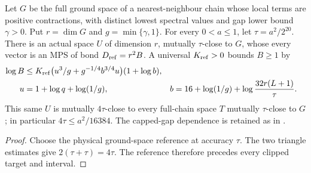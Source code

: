 \begin{lemma}
    \label{lem:interleaved_common_clipped_reference}
    \leanok
    Let $G$ be the full ground space of a nearest-neighbour chain whose
    local terms are positive contractions, with distinct lowest spectral
    values and gap lower bound $\gamma>0$. Put $r=\dim G$ and
    $g=\min\{\gamma,1\}$. For every $0<a\le1$, let $\tau=a^2/2^{20}$.
    There is an actual space $U$ of dimension $r$, mutually $\tau$-close
    to $G$, whose every vector is an MPS of bond $D_{\rm ref}=r^2B$.
    A universal $K_{\rm ref}>0$ bounds $B\ge1$ by
    \begin{align}
        \log B & \le K_{\rm ref}
        \bigl(u^3/g+g^{-1/4}b^{3/4}u\bigr)(1+\log b),\notag \\
        u      & =1+\log q+\log(1/g),                     &
        b      & =16+\log(1/g)+\log\frac{32r(L+1)}{\tau}.
        \label{eq:interleaved_clipped_reference_count}
    \end{align}
    This same $U$ is mutually $4\tau$-close to every full-chain space
    $T$ mutually $\tau$-close to $G$; in particular $4\tau\le a^2/16384$.
    The capped-gap dependence is retained as in
    \cite{gap:alvv16_approximation_parameters}.
\end{lemma}
\begin{proof}\leanok
    Choose the physical ground-space reference at accuracy $\tau$.
    The two triangle estimates give $2(\tau+\tau)=4\tau$.
    The reference therefore precedes every clipped target and interval.
\end{proof}


